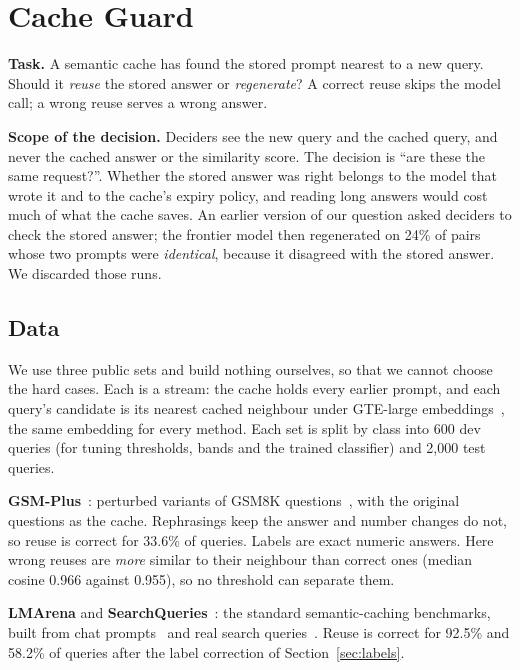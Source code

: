 \section{Cache Guard}
\label{sec:cache}

\textbf{Task.} A semantic cache has found the stored prompt nearest to a new query. Should it \emph{reuse} the stored answer or \emph{regenerate}?
A correct reuse skips the model call; a wrong reuse serves a wrong answer.

\textbf{Scope of the decision.} Deciders see the new query and the cached query, and never the cached answer or the similarity score.
The decision is ``are these the same request?''.
Whether the stored answer was right belongs to the model that wrote it and to the cache's expiry policy, and reading long answers would cost much of what the cache saves.
An earlier version of our question asked deciders to check the stored answer; the frontier model then regenerated on 24\% of pairs whose two prompts were \emph{identical}, because it disagreed with the stored answer. We discarded those runs.

\subsection{Data}

We use three public sets and build nothing ourselves, so that we cannot choose the hard cases.
Each is a stream: the cache holds every earlier prompt, and each query's candidate is its nearest cached neighbour under GTE-large embeddings~\cite{li2023gte}, the same embedding for every method.
Each set is split by class into 600 dev queries (for tuning thresholds, bands and the trained classifier) and 2,000 test queries.

\textbf{GSM-Plus}~\cite{li2024gsmplus}: perturbed variants of GSM8K questions~\cite{cobbe2021gsm8k}, with the original questions as the cache.
Rephrasings keep the answer and number changes do not, so reuse is correct for 33.6\% of queries.
Labels are exact numeric answers.
Here wrong reuses are \emph{more} similar to their neighbour than correct ones (median cosine 0.966 against 0.955), so no threshold can separate them.

\textbf{LMArena} and \textbf{SearchQueries}~\cite{schroeder2025vcache}: the standard semantic-caching benchmarks, built from chat prompts~\cite{chiang2024chatbotarena} and real search queries~\cite{craswell2020orcas}.
Reuse is correct for 92.5\% and 58.2\% of queries after the label correction of Section~\ref{sec:labels}.


